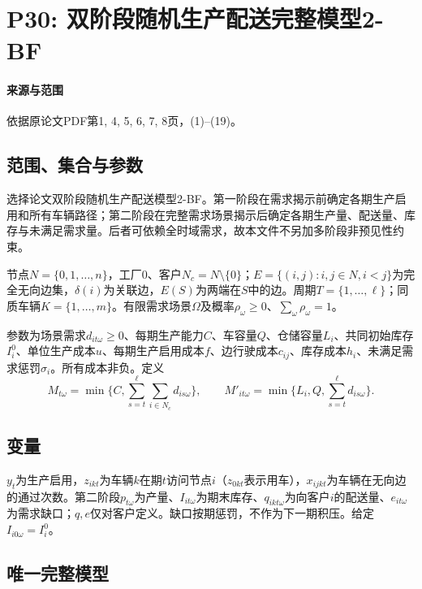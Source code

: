 \documentclass[UTF8,11pt]{ctexart}
\begin{document}
\section*{P30: 双阶段随机生产配送完整模型2-BF}
\paragraph{来源与范围}依据原论文PDF第1, 4, 5, 6, 7, 8页，(1)–(19)。
\subsection*{范围、集合与参数}
选择论文双阶段随机生产配送模型2-BF。第一阶段在需求揭示前确定各期生产启用和所有车辆路径；第二阶段在完整需求场景揭示后确定各期生产量、配送量、库存与未满足需求量。后者可依赖全时域需求，故本文件不另加多阶段非预见性约束。

节点$N=\{0,1,\ldots,n\}$，工厂0、客户$N_c=N\setminus\{0\}$；$E=\{(i,j):i,j\in N,i<j\}$为完全无向边集，$\delta(i)$为关联边，$E(S)$为两端在$S$中的边。周期$T=\{1,\ldots,\ell\}$；同质车辆$K=\{1,\ldots,m\}$。有限需求场景$\Omega$及概率$\rho_\omega\geq0$、$\sum_\omega\rho_\omega=1$。

参数为场景需求$d_{it\omega}\geq0$、每期生产能力$C$、车容量$Q$、仓储容量$L_i$、共同初始库存$I_i^0$、单位生产成本$u$、每期生产启用成本$f$、边行驶成本$c_{ij}$、库存成本$h_i$、未满足需求惩罚$\sigma_i$。所有成本非负。定义
\[
M_{t\omega}=\min\{C,\sum_{s=t}^{\ell}\sum_{i\in N_c}d_{is\omega}\},\qquad
M'_{it\omega}=\min\{L_i,Q,\sum_{s=t}^{\ell}d_{is\omega}\}.
\]
\subsection*{变量}
$y_t$为生产启用，$z_{ikt}$为车辆$k$在期$t$访问节点$i$（$z_{0kt}$表示用车），$x_{ijkt}$为车辆在无向边的通过次数。第二阶段$p_{t\omega}$为产量、$I_{it\omega}$为期末库存、$q_{ikt\omega}$为向客户$i$的配送量、$e_{it\omega}$为需求缺口；$q,e$仅对客户定义。缺口按期惩罚，不作为下一期积压。给定$I_{i0\omega}=I_i^0$。
\subsection*{唯一完整模型}
\end{document}
